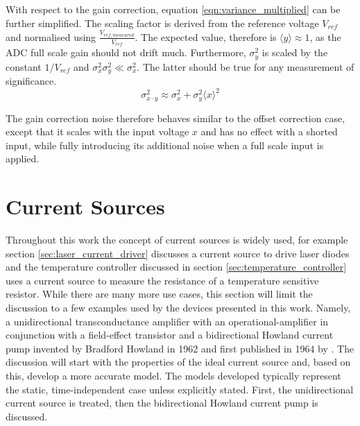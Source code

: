 With respect to the gain correction, equation \ref{eqn:variance_multiplied} can be further simplified. The scaling factor is derived from the reference voltage $V_{ref}$ and normalised using $\frac{V_{ref, measured}}{V_{ref}}$. The expected value, therefore is $\langle y \rangle \approx 1$, as the ADC full scale gain should not drift much. Furthermore, $\sigma_y^2$ is scaled by the constant $1/V_{ref}$ and $\sigma_x^2 \sigma_y^2 \ll \sigma_x^2$. The latter should be true for any measurement of significance.
\begin{equation}
    \sigma_{x \cdot y}^2 \approx \sigma_x^2 + \sigma_y^2 \langle x \rangle^2
\end{equation}

The gain correction noise therefore behaves similar to the offset correction case, except that it scales with the input voltage $x$ and has no effect with a shorted input, while fully introducing its additional noise when a full scale input is applied.



\clearpage
\section{Current Sources}
Throughout this work the concept of current sources is widely used, for example section \ref{sec:laser_current_driver} discusses a current source to drive laser diodes and the temperature controller discussed in section \ref{sec:temperature_controller} uses a current source to measure the resistance of a temperature sensitive resistor. While there are many more use cases, this section will limit the discussion to a few examples used by the devices presented in this work. Namely, a unidirectional transconductance amplifier with an operational-amplifier in conjunction with a field-effect transistor and a bidirectional Howland current pump invented by Bradford Howland in 1962 and first published in 1964 by \citeauthor{howland_current_source} \cite{howland_current_source}. The discussion will start with the properties of the ideal current source and, based on this, develop a more accurate model. The models developed typically represent the static, time-independent case unless explicitly stated. First, the unidirectional current source is treated, then the bidirectional Howland current pump is discussed.

